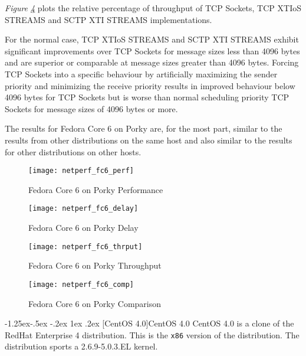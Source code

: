 \documentclass[letterpaper,final,notitlepage,twocolumn,10pt,twoside]{article}
\makeatletter
\let\normalsize = \small
\let\small = \footnotesize
\let\footnotesize = \scriptsize
\let\scriptsize = \tiny
\renewcommand\subsubsection{\@startsection{subsubsection}{3}{\z@}%
                                     {-1.25ex\@plus -.5ex \@minus -.2ex}%
                                     {1ex \@plus .2ex}%
                                     {\normalfont\normalsize\bfseries}}
\makeatother
\begin{document}
\begin{description}
\textit{Figure \ref{figure:fc6comp}}
plots the relative percentage of throughput of TCP Sockets, TCP XTIoS STREAMS and SCTP XTI STREAMS
implementations.

For the normal case, TCP XTIoS STREAMS and SCTP XTI STREAMS exhibit significant improvements over
TCP Sockets for message sizes less than 4096 bytes and are superior or comparable  at message sizes
greater than 4096 bytes.  Forcing TCP Sockets into a specific behaviour by artificially maximizing
the sender priority and minimizing the receive priority results in improved behaviour below 4096
bytes for TCP Sockets but is worse than normal scheduling priority TCP Sockets for message sizes of
4096 bytes or more.

\end{description}

The results for Fedora Core 6 on Porky are, for the most part, similar to the results from other
distributions on the same host and also similar to the results for other distributions on other
hosts.

\begin{figure}[p]
\center\texttt{[image: netperf\_fc6\_perf]}
\caption[Fedora Core 6 on Porky Performance]{Fedora Core 6 on Porky Performance}
\label{figure:fc6perf}
\end{figure}

\begin{figure}[p]
\center\texttt{[image: netperf\_fc6\_delay]}
\caption[Fedora Core 6 on Porky Delay]{Fedora Core 6 on Porky Delay}
\label{figure:fc6dly}
\end{figure}

\begin{figure}[p]
\center\texttt{[image: netperf\_fc6\_thrput]}
\caption[Fedora Core 6 on Porky Throughput]{Fedora Core 6 on Porky Throughput}
\label{figure:fc6thrput}
\end{figure}

\begin{figure}[pt]
\center\texttt{[image: netperf\_fc6\_comp]}
\caption[Fedora Core 6 on Porky Comparison]{Fedora Core 6 on Porky Comparison}
\label{figure:fc6comp}
\end{figure}

\subsubsection[CentOS 4.0]{CentOS 4.0}
CentOS 4.0 is a clone of the RedHat Enterprise 4 distribution.  This is the
\texttt{x86} version of the distribution.  The distribution sports a
2.6.9-5.0.3.EL kernel.
\end{document}
